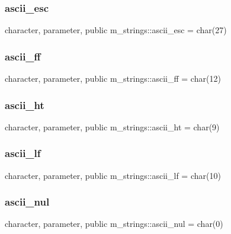 \subsubsection{\texorpdfstring{ascii\+\_\+esc}{ascii\_esc}}
{\footnotesize\ttfamily character, parameter, public m\+\_\+strings\+::ascii\+\_\+esc = char(27)}

\mbox{\label{namespacem__strings_a52761941cc3dba4a2ed922d1b7841c90}} 
\subsubsection{\texorpdfstring{ascii\+\_\+ff}{ascii\_ff}}
{\footnotesize\ttfamily character, parameter, public m\+\_\+strings\+::ascii\+\_\+ff = char(12)}

\mbox{\label{namespacem__strings_a3fef6116790e59c99f48ea31a7b00133}} 
\subsubsection{\texorpdfstring{ascii\+\_\+ht}{ascii\_ht}}
{\footnotesize\ttfamily character, parameter, public m\+\_\+strings\+::ascii\+\_\+ht = char(9)}

\mbox{\label{namespacem__strings_a4d65d248433f7c6ea3188c558f795c23}} 
\subsubsection{\texorpdfstring{ascii\+\_\+lf}{ascii\_lf}}
{\footnotesize\ttfamily character, parameter, public m\+\_\+strings\+::ascii\+\_\+lf = char(10)}

\mbox{\label{namespacem__strings_a9de5098e31c6411a43323b1d7f19a886}} 
\subsubsection{\texorpdfstring{ascii\+\_\+nul}{ascii\_nul}}
{\footnotesize\ttfamily character, parameter, public m\+\_\+strings\+::ascii\+\_\+nul = char(0)}

